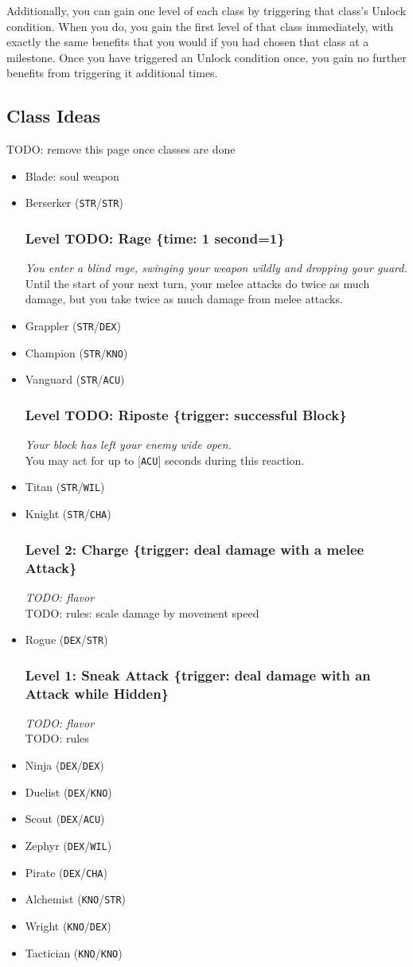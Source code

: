 \documentclass[12pt]{article}
\newcommand{\STR}{\texttt{STR}}
\newcommand{\DEX}{\texttt{DEX}}
\newcommand{\KNO}{\texttt{KNO}}
\newcommand{\ACU}{\texttt{ACU}}
\newcommand{\WIL}{\texttt{WIL}}
\newcommand{\CHA}{\texttt{CHA}}
\newcommand{\TIME}[1]{\{time: #1 second\if1=#1{}\else{s}\fi\}}
\newcommand{\TRIG}[1]{\{trigger: #1\}}
\newcommand{\Skill}[5]{\subsubsection{Level #1: #2 #3}\textit{#4}\\[1mm]#5}
\begin{document}
Additionally, you can gain one level of each class by triggering that class's Unlock condition. When you do, you gain the first level of that class immediately, with exactly the same benefits that you would if you had chosen that class at a milestone. Once you have triggered an Unlock condition once, you gain no further benefits from triggering it additional times.

\pagebreak
\subsection{Class Ideas}

TODO: remove this page once classes are done

\begin{itemize}
\item Blade: soul weapon
\item Berserker (\STR/\STR)

\Skill{TODO}{Rage}{\TIME{1}}
{You enter a blind rage, swinging your weapon wildly and dropping your guard.}
{Until the start of your next turn, your melee attacks do twice as much damage, but you take twice as much damage from melee attacks.}

\item Grappler (\STR/\DEX)
\item Champion (\STR/\KNO)
\item Vanguard (\STR/\ACU)

\Skill{TODO}{Riposte}{\TRIG{successful Block}}
{Your block has left your enemy wide open.}
{You may act for up to [\ACU] seconds during this reaction.}

\item Titan (\STR/\WIL)
\item Knight (\STR/\CHA)

\Skill{2}{Charge}{\TRIG{deal damage with a melee Attack}}
{TODO: flavor}
{TODO: rules: scale damage by movement speed}

\item Rogue (\DEX/\STR)

\Skill{1}{Sneak Attack}{\TRIG{deal damage with an Attack while Hidden}}
{TODO: flavor}
{TODO: rules}

\item Ninja (\DEX/\DEX)
\item Duelist (\DEX/\KNO)
\item Scout (\DEX/\ACU)
\item Zephyr (\DEX/\WIL)
\item Pirate (\DEX/\CHA)
\item Alchemist (\KNO/\STR)
\item Wright (\KNO/\DEX)
\item Tactician (\KNO/\KNO)


\end{itemize}
\end{document}
